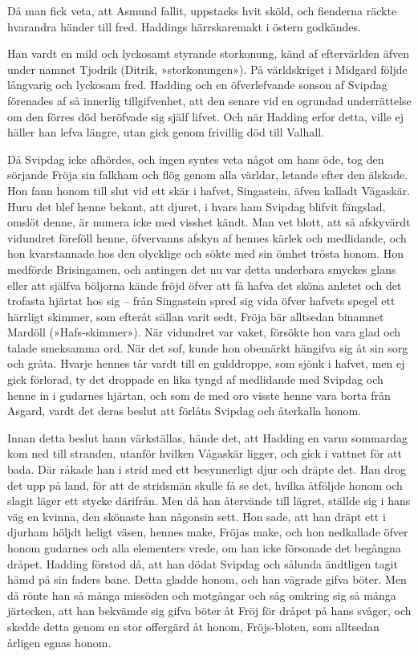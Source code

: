 Då man fick veta, att Asmund fallit, uppstacks hvit sköld, och fienderna
räckte hvarandra händer till fred. Haddings härrskaremakt i östern
godkändes.

Han vardt en mild och lyckosamt styrande storkonung, känd af
eftervärlden äfven under namnet Tjodrik (Ditrik, »storkonungen»). På
världskriget i Midgard följde långvarig och lyckosam fred. Hadding och
en öfverlefvande sonson af Svipdag förenades af så innerlig
tillgifvenhet, att den senare vid en ogrundad underrättelse om den
förres död beröfvade sig själf lifvet. Och när Hadding erfor detta,
ville ej häller han lefva längre, utan gick genom frivillig död till
Valhall.

Då Svipdag icke afhördes, och ingen syntes veta något om hans öde, tog
den sörjande Fröja sin falkham och flög genom alla världar, letande
efter den älskade. Hon fann honom till slut vid ett skär i hafvet,
Singastein, äfven kalladt Vågaskär. Huru det blef henne bekant, att
djuret, i hvars ham Svipdag blifvit fängslad, omslöt denne, är numera
icke med visshet kändt. Man vet blott, att så afskyvärdt vidundret
föreföll henne, öfvervanns afskyn af hennes kärlek och medlidande, och
hon kvarstannade hos den olycklige och sökte med sin ömhet trösta honom.
Hon medförde Brisingamen, och antingen det nu var detta underbara
smyckes glans eller att själfva böljorna kände fröjd öfver att få hafva
det sköna anletet och det trofasta hjärtat hos sig -- från Singastein
spred sig vida öfver hafvets spegel ett härrligt skimmer, som efteråt
sällan varit sedt. Fröja bär alltsedan binamnet Mardöll
(»Hafs-skimmer»). När vidundret var vaket, försökte hon vara glad och
talade smeksamma ord. När det sof,
kunde hon obemärkt hängifva sig åt sin sorg och gråta. Hvarje hennes tår
vardt till en gulddroppe, som sjönk i hafvet, men ej gick förlorad, ty
det droppade en lika tyngd af medlidande med Svipdag och henne in i
gudarnes hjärtan, och som de med oro visste henne vara borta från
Asgard, vardt det deras beslut att förlåta Svipdag och återkalla honom.

Innan detta beslut hann värkställas, hände det, att Hadding en varm
sommardag kom ned till stranden, utanför hvilken Vågaskär ligger, och
gick i vattnet för att bada. Där råkade han i strid med ett besynnerligt
djur och dräpte det. Han drog det upp på land, för att de stridsmän
skulle få se det, hvilka åtföljde honom och slagit läger ett stycke
därifrån. Men då han återvände till lägret, ställde sig i hans väg en
kvinna, den skönaste han någonsin sett. Hon sade, att han dräpt ett i
djurham höljdt heligt väsen, hennes make, Fröjas make, och hon
nedkallade öfver honom gudarnes och alla elementers vrede, om han icke
försonade det begångna dråpet. Hadding förstod då, att han dödat Svipdag
och sålunda ändtligen tagit hämd på sin faders bane. Detta gladde honom,
och han vägrade gifva böter. Men då rönte han så många missöden och
motgångar och såg omkring sig så många järtecken, att han bekvämde sig
gifva böter åt Fröj för dråpet på hans svåger, och skedde detta genom en
stor offergärd åt honom, Fröjs-bloten, som alltsedan årligen egnas
honom.

